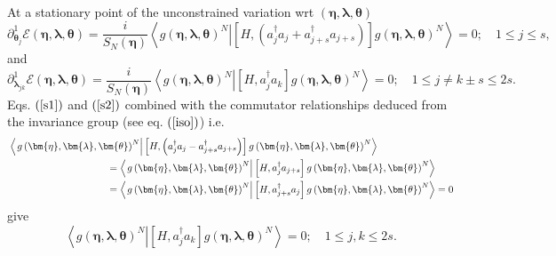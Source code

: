 \documentclass{preprint}
\begin{document}
At a stationary point of the unconstrained variation wrt $\left( \bm{\eta},%
\bm{\lambda},\bm{\theta}\right) $
\begin{equation}
\partial_{\bm{\theta}_{j}}^{1}\mathcal{E}\left( \bm{\eta },\bm{\lambda},%
\bm{\theta}\right) =\frac{i}{S_{N}\left( \bm{\eta}\right) }\left\langle
\left. g\left( \bm{\eta },\bm{\lambda},\bm{\theta}\right) ^{N}\right\vert %
\left[ H,\left( a_{j}^{\dagger}a_{j}+a_{j+s}^{\dagger}a_{j+s}\right) \right]
g\left( \bm{\eta},\bm{\lambda},\bm{\theta}\right) ^{N}\right\rangle
=0;\quad1\leq j\leq s,  \label{s1}
\end{equation}
and%
\begin{equation}
\partial_{\bm{\lambda}_{jk}}^{1}\mathcal{E}\left( \bm{\eta },\bm{\lambda},%
\bm{\theta}\right) =\frac{i}{S_{N}\left( \bm{\eta}\right) }\left\langle
\left. g\left( \bm{\eta },\bm{\lambda},\bm{\theta}\right) ^{N}\right\vert %
\left[ H,a_{j}^{\dagger}a_{k}\right] g\left( \bm{\eta},\bm{\lambda },%
\bm{\theta}\right) ^{N}\right\rangle =0;\quad1\leq j\neq k\pm s\leq2s.
\label{s2}
\end{equation}
Eqs. $\left( \ref{s1}\right) $ and $\left( \ref{s2}\right) $ combined with
the commutator relationships deduced from the invariance group (see eq. $%
\left( \ref{iso}\right) $) i.e.
\begin{align}
& \left\langle \left. g\left( \bm{\eta},\bm{\lambda},\bm{\theta }\right)
^{N}\right\vert \left[ H,\left( a_{j}^{\dagger}a_{j}-a_{j+s}^{\dagger
}a_{j+s}\right) \right] g\left( \bm{\eta },\bm{\lambda},\bm{\theta}\right)
^{N}\right\rangle  \notag \\
& \qquad\qquad\qquad\qquad\qquad\left. =\right. \left\langle \left. g\left( %
\bm{\eta},\bm{\lambda},\bm{\theta}\right) ^{N}\right\vert \left[
H,a_{j}^{\dagger}a_{j+s}\right] g\left( \bm{\eta },\bm{\lambda},\bm{\theta}%
\right) ^{N}\right\rangle  \notag \\
& \qquad\qquad\qquad\qquad\qquad\left. =\right. \left\langle \left. g\left( %
\bm{\eta},\bm{\lambda},\bm{\theta}\right) ^{N}\right\vert \left[
H,a_{j+s}^{\dagger}a_{j}\right] g\left( \bm{\eta },\bm{\lambda},\bm{\theta}%
\right) ^{N}\right\rangle \left. =\right. 0
\end{align}
give
\begin{equation}
\left\langle \left. g\left( \bm{\eta},\bm{\lambda},\bm{\theta }\right)
^{N}\right\vert \left[ H,a_{j}^{\dagger}a_{k}\right] g\left( \bm{\eta},%
\bm{\lambda},\bm{\theta}\right) ^{N}\right\rangle =0;\quad1\leq j,k\leq2s.
\label{s3}
\end{equation}
\end{document}

